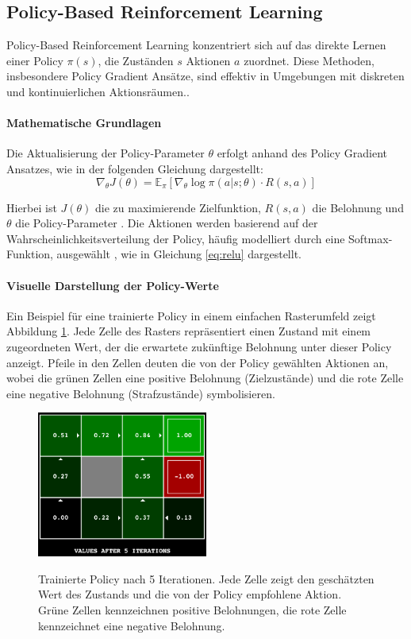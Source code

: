\subsection{Policy-Based Reinforcement Learning}

Policy-Based Reinforcement Learning konzentriert sich auf das direkte Lernen einer Policy \(\pi(s)\), die Zuständen \(s\) Aktionen \(a\) zuordnet. Diese Methoden, insbesondere Policy Gradient Ansätze, sind effektiv in Umgebungen mit diskreten und kontinuierlichen Aktionsräumen.\cite{SuttonBarto2018}.

\paragraph{Mathematische Grundlagen}
Die Aktualisierung der Policy-Parameter \(\theta\) erfolgt anhand des Policy Gradient Ansatzes, wie in der folgenden Gleichung dargestellt:
\begin{equation} 
\nabla_{\theta} J(\theta) = \mathbb{E}_{\pi} \left[ \nabla_{\theta} \log \pi(a | s; \theta) \cdot R(s, a) \right]
		\label{eq:policy_gradient}
\end{equation}

Hierbei ist \(J(\theta)\) die zu maximierende Zielfunktion, \(R(s, a)\) die Belohnung und \(\theta\) die Policy-Parameter \cite{russell2021ai}. Die Aktionen werden basierend auf der Wahrscheinlichkeitsverteilung der Policy, häufig modelliert durch eine Softmax-Funktion, ausgewählt \cite{russell2021ai}, wie in Gleichung \ref{eq:relu} dargestellt.

\paragraph{Visuelle Darstellung der Policy-Werte}
Ein Beispiel für eine trainierte Policy in einem einfachen Rasterumfeld zeigt Abbildung \ref{fig:trained_policy}. Jede Zelle des Rasters repräsentiert einen Zustand mit einem zugeordneten Wert, der die erwartete zukünftige Belohnung unter dieser Policy anzeigt. Pfeile in den Zellen deuten die von der Policy gewählten Aktionen an, wobei die grünen Zellen eine positive Belohnung (Zielzustände) und die rote Zelle eine negative Belohnung (Strafzustände) symbolisieren.

\begin{figure}[h]
\centering
\includegraphics[width=0.5\textwidth]{2Grundlagen/33Policy.png}
\caption{Trainierte Policy nach 5 Iterationen. Jede Zelle zeigt den geschätzten Wert des Zustands und die von der Policy empfohlene Aktion. Grüne Zellen kennzeichnen positive Belohnungen, die rote Zelle kennzeichnet eine negative Belohnung.}
\label{fig:trained_policy}
  \cite{klein_abbeel_cs188}
\end{figure}
%
